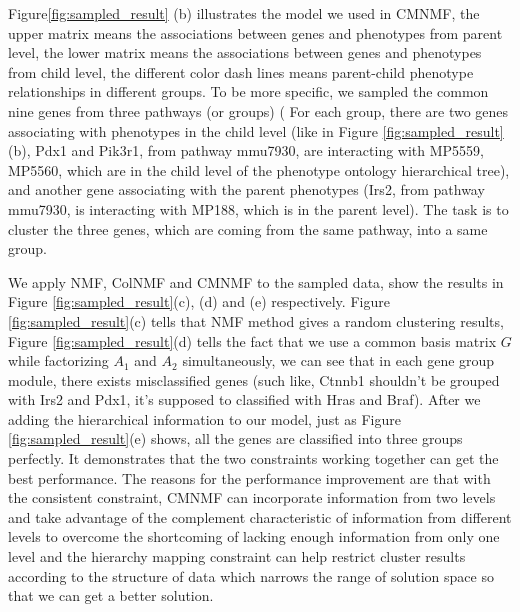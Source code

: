 \documentclass{bmcart}
\begin{document}
Figure\ref{fig:sampled_result} (b) illustrates the model we used in CMNMF, the upper matrix means the associations between genes and phenotypes from parent level, the lower matrix means the associations between genes and phenotypes from child level, the different color dash lines means parent-child phenotype relationships in different groups.
To be more specific, we sampled the common nine genes from three pathways (or groups) ( For each group, there are two genes associating with phenotypes in the child level (like in Figure \ref{fig:sampled_result}(b), Pdx1 and Pik3r1, from pathway mmu7930, are interacting with MP5559, MP5560, which are in the child level of the phenotype ontology hierarchical tree), and another gene associating with the parent phenotypes (Irs2, from pathway mmu7930, is interacting with MP188, which is in the parent level). The task is to cluster the three genes, which are coming from the same pathway, into a same group.

We apply NMF, ColNMF and CMNMF to the sampled data, show the results in Figure \ref{fig:sampled_result}(c), (d) and (e) respectively. Figure \ref{fig:sampled_result}(c) tells that NMF method gives a random clustering results, Figure \ref{fig:sampled_result}(d) tells the fact that we use a common basis matrix $G$ while factorizing $A_1$ and $A_2$ simultaneously, we can see that in each gene group module, there exists misclassified genes (such like, Ctnnb1 shouldn't be grouped with Irs2 and Pdx1, it's supposed to classified with Hras and Braf). After we adding the hierarchical information to our model, just as Figure \ref{fig:sampled_result}(e) shows, all the genes are classified into three groups perfectly. It demonstrates that the two constraints working together can get the best performance. The reasons for the performance improvement are that with the consistent constraint, CMNMF can incorporate information from two levels and take advantage of the complement characteristic of information from different levels to overcome the shortcoming of lacking enough information from only one level and the hierarchy mapping constraint can help restrict cluster results according to the structure of data which narrows the range of solution space so that we can get a better solution.
\end{document}
